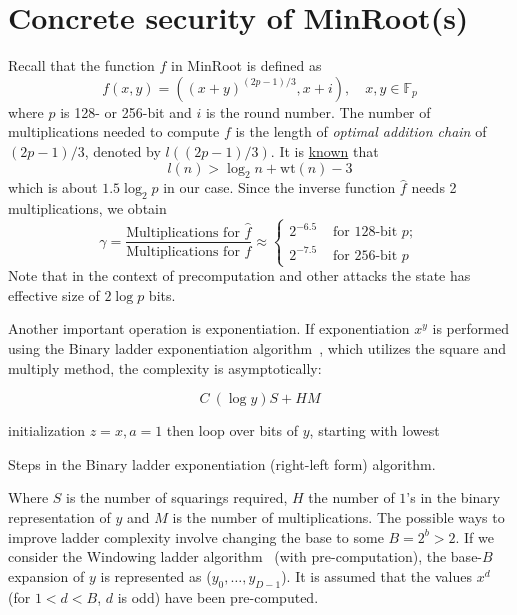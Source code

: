 \documentclass{article}
\begin{document}
 
\section{ Concrete security of MinRoot(s)}

Recall that the  function $f$ in MinRoot is defined as 
$$
f(x,y)
 = ((x+y)^{(2p-1)/3},x+i),\quad x,y\in \mathbb{F}_p
 $$
 where $p$ is 128- or 256-bit and $i$ is the round number. The number of multiplications needed to compute $f$ is the length of \emph{optimal addition chain} of $(2p-1)/3$, denoted by $l((2p-1)/3)$. It is \href{https://www.sciencedirect.com/science/article/pii/0304397575900080}{known} that
 $$
 l(n) > \log_2 n +\mathrm{wt}(n)-3
 $$ which is about $1.5\log_2 p$ in our case. Since the inverse function $\widehat{f}$ needs 2 multiplications, we obtain $$
 \gamma = \frac{\text{Multiplications for }\widehat{f}}{\text{Multiplications for }{f}}\approx
\begin{cases} 2^{-6.5} & \text{ for 128-bit } p;\\ 2^{-7.5}& \text{ for 256-bit }p
\end{cases}
$$
Note that in the context of precomputation and other attacks the state has effective size of $2\log p$ bits.

Another important operation is exponentiation. If exponentiation $x^y$ is performed using the Binary ladder exponentiation algorithm~\cite{Crandall_Pomerance_2005}, which utilizes the square and multiply method, the complexity is asymptotically:

$$ C ~ (\log y)S + HM $$

\begin{algorithm}[H]
 
 initialization $z=x, a=1$\;
 then loop over bits of $y$, starting with lowest\;
 \caption{Steps in the Binary ladder exponentiation (right-left form) algorithm.}
\end{algorithm}

Where $S$ is the number of squarings required, $H$ the number of $1$'s in the binary representation of $y$ and $M$ is the number of multiplications. The possible ways to improve ladder complexity involve changing the base to some $B = 2^b >2$. If we consider the Windowing ladder algorithm~\cite{Crandall_Pomerance_2005} (with pre-computation), the base-$B$ expansion of $y$ is represented as ($y_0, \dots, y_{D-1}$). It is assumed that the values $x^d$ (for $1 < d < B$, $d$ is odd) have been pre-computed. 
\end{document}
